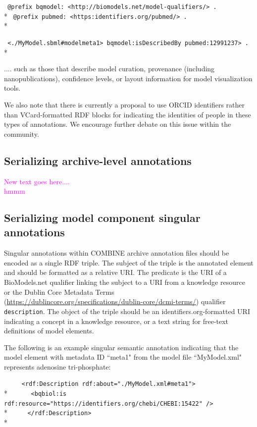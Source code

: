 \documentclass[pdftex,rgb,dvipsnames,svgnames,hyperref,table]{report}
\begin{document}
 \verb| @prefix bqmodel: <http://biomodels.net/model-qualifiers/> . |\\*
 \verb| @prefix pubmed: <https:identifiers.org/pubmed/> . |\\*
 
 \verb| <./MyModel.sbml#modelmeta1> bqmodel:isDescribedBy pubmed:12991237> . |\\*
 
.... such as those that describe model curation, provenance (including nanopublications), confidence levels, or layout information for model visualization tools. 

We also note that there is currently a proposal to use ORCID identifiers rather than VCard-formatted RDF blocks for indicating the identities of people in these types of annotations. We encourage further debate on this issue within the community.  

\subsection{Serializing archive-level annotations}
\textcolor{magenta} {New text goes here....\\
hmmm}


\subsection{Serializing model component singular annotations}
\label{singularanns}
Singular annotations within COMBINE archive annotation files should be encoded as a single RDF triple. The subject of the triple is the annotated element and should be formatted as a relative URI. The predicate is the URI of a BioModels.net qualifier linking the subject to a URI from a knowledge resource or the Dublin Core Metadata Terms (\url{https://dublincore.org/specifications/dublin-core/dcmi-terms/}) qualifier \texttt{description}. The object of the triple should be an identifiers.org-formatted URI indicating a concept in a knowledge resource, or a text string for free-text definitions of model elements.

 
The following is an example singular semantic annotation indicating that the model element with metadata ID ``meta1" from the model file ``MyModel.xml" represents adenosine tri-phosphate:

 \verb|     <rdf:Description rdf:about="./MyModel.xml#meta1">|\\*
 \verb|      <bqbiol:is rdf:resource="https://identifiers.org/chebi/CHEBI:15422" />|\\*
 \verb|     </rdf:Description>|\\*
\end{document}
